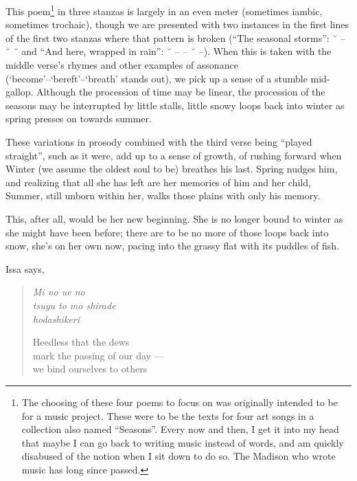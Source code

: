 This poem\footnote{The choosing of these four poems to focus on was originally intended to be for a music project. These were to be the texts for four art songs in a collection also named ``Seasons''. Every now and then, I get it into my head that maybe I can go back to writing music instead of words, and am quickly disabused of the notion when I sit down to do so. The Madison who wrote music has long since passed.} in three stanzas is largely in an even meter (sometimes iambic, sometimes trochaic), though we are presented with two instances in the first lines of the first two stanzas where that pattern is broken (``The seasonal storms'': ˘ -- ˘ ˘ and ``And here, wrapped in rain'': ˘ -- -- ˘ --). When this is taken with the middle verse's rhymes and other examples of assonance (`become'--`bereft'--`breath' stands out), we pick up a sense of a stumble mid-gallop. Although the procession of time may be linear, the procession of the seasons may be interrupted by little stalls, little snowy loops back into winter as spring presses on towards summer.

These variations in prosody combined with the third verse being ``played straight'', such as it were, add up to a sense of growth, of rushing forward when Winter (we assume the oldest soul to be) breathes his last. Spring nudges him, and realizing that all she has left are her memories of him and her child, Summer, still unborn within her, walks those plains with only his memory.

This, after all, would be her new beginning. She is no longer bound to winter as she might have been before; there are to be no more of those loops back into snow, she's on her own now, pacing into the grassy flat with its puddles of fish.

Issa says,

\begin{verse}
\begin{multicols}{2}
\emph{Mi no ue no} \\
\emph{tsuyu to mo shirade} \\
\emph{hodashikeri}

\columnbreak

Heedless that the dews \\
mark the passing of our day --- \\
we bind ourselves to others
\end{multicols}
\vspace{-1em}
\parencite[11]{issa}
\end{verse}

